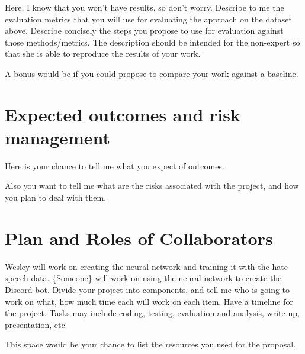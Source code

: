 \documentclass[conference]{sig-alternate-05-2015}
\begin{document}
Here, I know that you won't have results, so don't worry. Describe to me the evaluation metrics that you will use for evaluating the approach on the dataset above. Describe concisely the steps you propose to use for evaluation against those methods/metrics. The description should be intended for the non-expert so that she is able to reproduce the results of your work. 

A bonus would be if you could propose to compare your work against a baseline. 
\color{black}

\section{Expected outcomes and risk management}

\color{red}Here is your chance to tell me what you expect of outcomes.

Also you want to tell me what are the risks associated with the project, and how you plan to deal with them.
\color{black}

\section{Plan and Roles of Collaborators}

Wesley will work on creating the neural network and training it with the hate speech data.
\{Someone\} will work on using the neural network to create the Discord bot.
\color{red}Divide your project into components, and tell me who is going to work on what, how much time each will work on each item. Have a timeline for the project. Tasks may include coding, testing, evaluation and analysis, write-up, presentation, etc.
\color{black}


\color{black}


\color{red}This space would be your chance to list the resources you used for the proposal.
\end{document}

